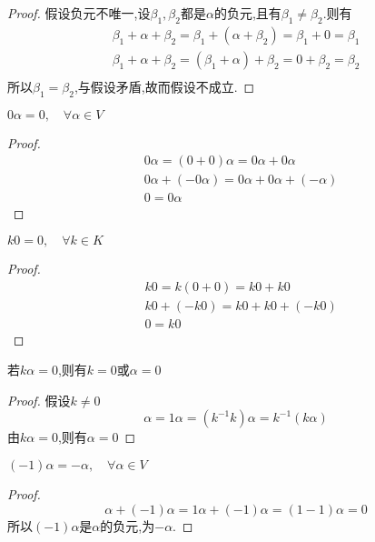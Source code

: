 \documentclass[blue,normal,cn]{elegantnote}
\begin{document}
\begin{proof}
    假设负元不唯一,设$β_1,β_2$都是$α$的负元,且有$β_1 ≠ β_2 $.则有
    $$
        \begin{aligned}
            β_1+α+β_2=β_1+(α+β_2)=β_1+0=β_1\\
            β_1+α+β_2= (β_1+α)+β_2=0+β_2=β_2\\
        \end{aligned}
    $$
    所以$β_1=β_2$,与假设矛盾,故而假设不成立.
\end{proof}


\begin{property}
    $0α=0,\quad \forall α ∈ V$
\end{property}

\begin{proof}
    $$
        \begin{aligned}
        &0α=(0+0)α=0α+0α\\
        &0α+(-0α)=0α+0α+(-α)\\
        &0=0α
        \end{aligned}
    $$
\end{proof}


\begin{property}
    $k0=0,\quad \forall k ∈ K$
\end{property}

\begin{proof}
    $$
        \begin{aligned}
        &k0=k(0+0)=k0+k0\\
        &k0+(-k0)=k0+k0+(-k0)\\
        &0=k0
        \end{aligned}
    $$
\end{proof}

\begin{property}
   若$kα=0$,则有$k=0$或$α=0$
\end{property}

\begin{proof}
    假设$k≠ 0$
    $$
        α=1α=(k^{-1}k)α=k^{-1}(kα)
    $$
    由$kα=0$,则有$α=0$
\end{proof}


\begin{property}
    $(-1)α=-α,\quad \forall α ∈ V$
 \end{property}
 
 \begin{proof}
     $$
         α+(-1)α=1α+(-1)α=(1-1)α=0
     $$
     所以$(-1)α$是$α$的负元,为$-α$.
 \end{proof}
\end{document}
